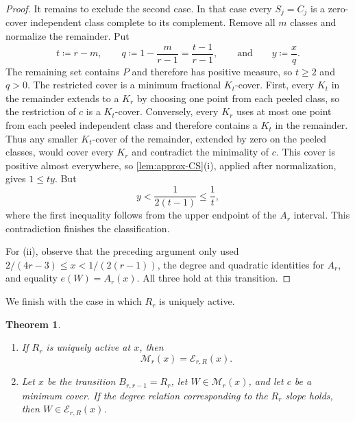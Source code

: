 \documentclass[10pt]{article}
\numberwithin{equation}{section}
\newtheorem{theorem}{Theorem}[section]
\newcommand{\cE}{\mathcal E}
\newcommand{\cM}{\mathcal M}
\begin{document}
\begin{proof}
It remains to exclude the second case.  In that case every $S_j=C_j$ is a zero-cover independent class complete to its complement.  Remove all $m$ classes and normalize the remainder.  Put
\[
 t\coloneqq r-m,
 \qquad
 q\coloneqq1-\frac{m}{r-1}=\frac{t-1}{r-1},
 \qquad\text{and}\qquad
 y\coloneqq\frac{x}{q}.
\]
The remaining set contains $P$ and therefore has positive measure, so $t\ge2$ and $q>0$.  The restricted cover is a minimum fractional $K_t$-cover.  First, every $K_t$ in the remainder extends to a $K_r$ by choosing one point from each peeled class, so the restriction of $c$ is a $K_t$-cover.  Conversely, every $K_r$ uses at most one point from each peeled independent class and therefore contains a $K_t$ in the remainder.  Thus any smaller $K_t$-cover of the remainder, extended by zero on the peeled classes, would cover every $K_r$ and contradict the minimality of $c$.  This cover is positive almost everywhere, so \cref{lem:approx-CS}(i), applied after normalization, gives $1\le ty$.  But
\[
 y<\frac1{2(t-1)}\le\frac1t,
\]
where the first inequality follows from the upper endpoint of the $A_r$ interval.  This contradiction finishes the classification.

For \textup{(ii)}, observe that the preceding argument only used $2/(4r-3)\le x<1/(2(r-1))$, the degree and quadratic identities for $A_r$, and equality $e(W)=A_r(x)$.  All three hold at this transition.
\end{proof}

We finish with the case in which $R_r$ is uniquely active.

\label{sec:Rphase}
\begin{theorem}\label{thm:R-classification}
\begin{enumerate}[label=\textup{(\roman*)}]
\item If $R_r$ is uniquely active at $x$, then
\[
 \cM_r(x)=\cE_{r,R}(x).
\]
\item Let $x$ be the transition $B_{r,r-1}=R_r$, let $W\in\cM_r(x)$, and let $c$ be a minimum cover.  If the degree relation corresponding to the $R_r$ slope holds, then $W\in\cE_{r,R}(x)$.
\end{enumerate}
\end{theorem}
\end{document}
